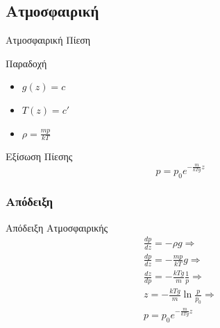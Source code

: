 \documentclass[greek]{beamer}
\begin{document}
\subsection{Ατμοσφαιρική}
\begin{frame}{Ατμοσφαιρική Πίεση}
  \begin{block}{Παραδοχή}
    \begin{itemize}
      \item $g(z)=c$
      \item $T(z)=c'$
      \item $\displaystyle ρ=\frac{mp}{kT}$
    \end{itemize}
  \end{block}
  Εξίσωση Πίεσης $$p=p_0e^{-\frac{m}{kTg}z}$$
\end{frame}

\subsubsection{Απόδειξη}
\begin{frame}{Απόδειξη Ατμοσφαιρικής}
  \begin{gather*}
   \frac{dp}{dz}=-ρg \Rightarrow \\ \frac{dp}{dz}=-\frac{mp}{kT}g \Rightarrow \\ \frac{dz}{dp}=-\frac{kTg}{m}\frac{1}{p} \Rightarrow \\ z=-\frac{kTg}{m}\ln \frac{p}{p_0} \Rightarrow \\ p=p_0e^{-\frac{m}{kTg}z}
  \end{gather*}
\end{frame}
\end{document}
